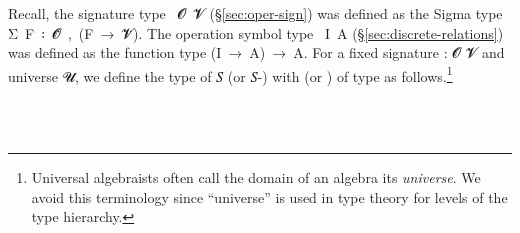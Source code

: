 
Recall, the signature type ~\ab 𝓞~\ab 𝓥 (\S\ref{sec:oper-sign}) was defined as the Sigma type \af Σ~\ab F~\af ꞉~\ab 𝓞\af ̇~\af ,~(\ab F~\as →~\ab 𝓥\af ̇). The operation symbol type ~\ab I~\ab A (\S\ref{sec:discrete-relations}) was defined as the function type (\ab I~\as →~\ab A)~\as →~\ab A.  For a fixed signature  \as :  \ab 𝓞 \ab 𝓥 and universe \ab 𝓤, we define the type of  \ab 𝑆 (or \ab 𝑆-) with  (or ) of type \AgdaSpace{}%
\AgdaSpace{}%
as follows.\footnote{Universal algebraists often call the domain of an algebra its \emph{universe}.  We avoid this terminology since ``universe'' is used in type theory for levels of the type hierarchy.}
\ccpad
\begin{code}%
\>[0]\AgdaSpace{}%
\AgdaSymbol{:}\AgdaSpace{}%
\AgdaSymbol{(}\AgdaSpace{}%
\AgdaSymbol{:}\AgdaSpace{}%
\AgdaSymbol{)(}\AgdaSpace{}%
\AgdaSymbol{:}\AgdaSpace{}%
\AgdaSpace{}%
\AgdaSpace{}%
\AgdaSymbol{)}\AgdaSpace{}%
\AgdaSpace{}%
\AgdaSpace{}%
\AgdaSpace{}%
\AgdaSpace{}%
\AgdaSpace{}%
\AgdaSpace{}%
\AgdaSpace{}%
\<%
\\
%
\>[0]\AgdaSpace{}%
\AgdaSpace{}%
\AgdaSpace{}%
\AgdaSymbol{=}%
\>[29I]\AgdaSpace{}%
\AgdaSpace{}%
\AgdaSpace{}%
\AgdaSpace{}%
\AgdaSpace{}%
\AgdaFunction{,}%
\>[50]\<%
\\
\>[.][@{}l@{}]\<[29I]%
\>[14]\AgdaSpace{}%
\AgdaSpace{}%
\AgdaSpace{}%
\AgdaSpace{}%
\AgdaSpace{}%
\AgdaSpace{}%
\AgdaFunction{,}\AgdaSpace{}%
\AgdaSpace{}%
\AgdaSymbol{(}\AgdaSpace{}%
\AgdaSpace{}%
\AgdaSpace{}%
\AgdaSymbol{)}\AgdaSpace{}%
%
\>[50]\<%
\end{code}
\scpad

